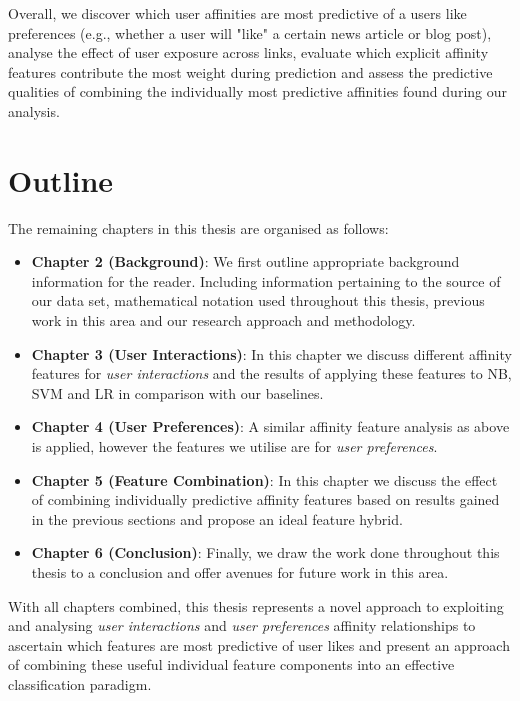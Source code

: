 Overall, we discover which user affinities are most predictive of a users like preferences (e.g., 
whether a user will "like" a certain news article or blog post), analyse the effect of user exposure across links, 
evaluate which explicit affinity features contribute the most weight during prediction and assess the predictive qualities of combining 
the individually most predictive affinities found during our analysis.

\section{Outline}
\label{sec:outline}

The remaining chapters in this thesis are organised as follows:
\begin{itemize}
\item \textbf{Chapter 2 (Background)}: We first outline appropriate background information for the reader. Including information pertaining to the source of 
our data set, mathematical notation used throughout this thesis, previous work in this area and our research approach and methodology.
\item \textbf{Chapter 3 (User Interactions)}: In this chapter we discuss different affinity features for \emph{user interactions} and the results of applying these features to NB, SVM and LR 
in comparison with our baselines.
\item \textbf{Chapter 4 (User Preferences)}: A similar affinity feature analysis as above is applied, however the features we utilise are for \emph{user preferences}.
\item \textbf{Chapter 5 (Feature Combination)}: In this chapter we discuss the effect of combining individually predictive affinity features based on results gained in the previous sections
and propose an ideal feature hybrid.
\item \textbf{Chapter 6 (Conclusion)}: Finally, we draw the work done throughout this thesis to a conclusion and offer avenues for future work in this area.
\end{itemize}

With all chapters combined, this thesis represents a novel approach to exploiting and analysing \emph{user interactions} and \emph{user preferences} affinity relationships
to ascertain which features are most predictive of user likes and present an approach of combining these useful individual feature components into an effective 
classification paradigm.

